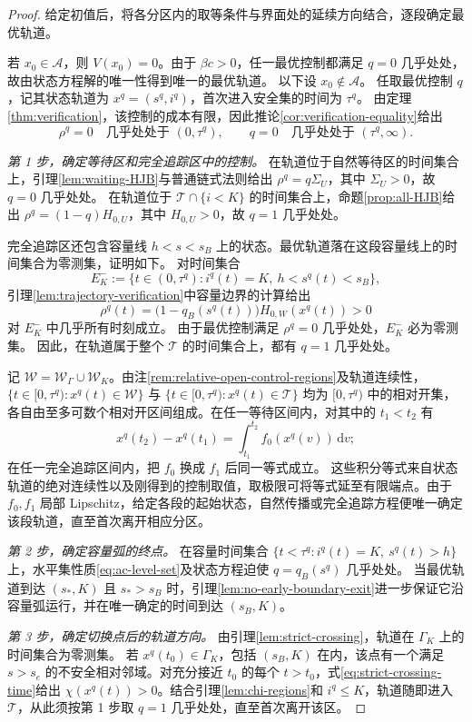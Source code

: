 \documentclass[lang=cn,a4paper,newtx]{elegantpaper}
\theoremstyle{plain}
\theoremstyle{definition}
\newcommand{\Acal}{\mathcal A}
\newcommand{\dd}{\,\mathrm d}
\begin{document}
\begin{proof}
给定初值后，将各分区内的取等条件与界面处的延续方向结合，逐段确定最优轨道。

若 $x_0\in\Acal$，则 $V(x_0)=0$。由于 $\beta c>0$，任一最优控制都满足 $q=0$ 几乎处处，故由状态方程解的唯一性得到唯一的最优轨道。
以下设 $x_0\notin\Acal$。
任取最优控制 $q$，记其状态轨道为 $x^q=(s^q,i^q)$，首次进入安全集的时间为 $\tau^q$。
由定理\ref{thm:verification}，该控制的成本有限，因此推论\ref{cor:verification-equality}给出
\[
\rho^q=0\quad\text{几乎处处于 }(0,\tau^q),\qquad
q=0\quad\text{几乎处处于 }(\tau^q,\infty).
\]

\emph{第 1 步，确定等待区和完全追踪区中的控制。}
在轨道位于自然等待区的时间集合上，引理\ref{lem:waiting-HJB}与普通链式法则给出 $\rho^q=q\Sigma_U$，其中 $\Sigma_U>0$，故 $q=0$ 几乎处处。
在轨道位于 $\mathcal T\cap\{i<K\}$ 的时间集合上，命题\ref{prop:all-HJB}给出 $\rho^q=(1-q)H_{0,U}$，其中 $H_{0,U}>0$，故 $q=1$ 几乎处处。

完全追踪区还包含容量线 $h<s<s_B$ 上的状态。最优轨道落在这段容量线上的时间集合为零测集，证明如下。
对时间集合
\[
E_K^-:=\{t\in(0,\tau^q):i^q(t)=K,\ h<s^q(t)<s_B\},
\]
引理\ref{lem:trajectory-verification}中容量边界的计算给出
\[
\rho^q(t)
=\bigl(1-q_B(s^q(t))\bigr)H_{0,W}(x^q(t))>0
\]
对 $E_K^-$ 中几乎所有时刻成立。
由于最优控制满足 $\rho^q=0$ 几乎处处，$E_K^-$ 必为零测集。
因此，在轨道属于整个 $\mathcal T$ 的时间集合上，都有 $q=1$ 几乎处处。

记 $\mathcal W=\mathcal W_\Gamma\cup\mathcal W_K$。由注\ref{rem:relative-open-control-regions}及轨道连续性，$\{t\in[0,\tau^q):x^q(t)\in\mathcal W\}$ 与 $\{t\in[0,\tau^q):x^q(t)\in\mathcal T\}$ 均为 $[0,\tau^q)$ 中的相对开集，各自由至多可数个相对开区间组成。在任一等待区间内，对其中的 $t_1<t_2$ 有
\[
x^q(t_2)-x^q(t_1)=\int_{t_1}^{t_2}f_0(x^q(v))\dd v;
\]
在任一完全追踪区间内，把 $f_0$ 换成 $f_1$ 后同一等式成立。
这些积分等式来自状态轨道的绝对连续性以及刚得到的控制取值，取极限可将等式延至有限端点。由于 $f_0,f_1$ 局部 Lipschitz，给定各段的起始状态，自然传播或完全追踪方程便唯一确定该段轨道，直至首次离开相应分区。

\emph{第 2 步，确定容量弧的终点。}
在容量时间集合 $\{t<\tau^q:i^q(t)=K,\ s^q(t)>h\}$ 上，水平集性质\eqref{eq:ac-level-set}及状态方程迫使 $q=q_B(s^q)$ 几乎处处。
当最优轨道到达 $(s_*,K)$ 且 $s_*>s_B$ 时，引理\ref{lem:no-early-boundary-exit}进一步保证它沿容量弧运行，并在唯一确定的时间到达 $(s_B,K)$。

\emph{第 3 步，确定切换点后的轨道方向。}
由引理\ref{lem:strict-crossing}，轨道在 $\Gamma_K$ 上的时间集合为零测集。
若 $x^q(t_0)\in\Gamma_K$，包括 $(s_B,K)$ 在内，该点有一个满足 $s>s_e$ 的不安全相对邻域。对充分接近 $t_0$ 的每个 $t>t_0$，式\eqref{eq:strict-crossing-time}给出 $\chi(x^q(t))>0$。结合引理\ref{lem:chi-regions}和 $i^q\le K$，轨道随即进入 $\mathcal T$，从此须按第 1 步取 $q=1$ 几乎处处，直至首次离开该区。


\end{proof}
\end{document}
